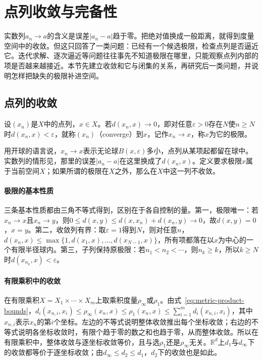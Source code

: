 \section{点列收敛与完备性}
\label{sec:metric-convergence-completeness}

实数列$a_n\to a$的含义是误差$|a_n-a|$趋于零。把绝对值换成一般距离，就得到度量空间中的收敛。但这只回答了一类问题：已经有一个候选极限，检查点列是否逼近它。迭代求解、逐次逼近等问题往往事先不知道极限在哪里，只能观察点列内部的项是否越来越接近。本节先建立收敛和它与闭集的关系，再研究后一类问题，并说明怎样把缺失的极限补进空间。

\subsection{点列的收敛}
\label{sec:metric-convergence}

\begin{definition}[点列的收敛]
\label{def:metric-convergence}
设$(x_n)$是$X$中的点列，$x\in X$。若$d(x_n,x)\to0$，即对任意$\varepsilon>0$存在$N$使$n\geq N$时$d(x_n,x)<\varepsilon$，就称$(x_n)$（converge）到$x$，记作$x_n\to x$，称$x$为它的极限。
\end{definition}

用开球的语言说，$x_n\to x$表示无论球$B(x,\varepsilon)$多小，点列从某项起都留在球中。实数列的情形见，那里的误差$|a_n-a|$在这里换成了$d(x_n,x)$。定义要求极限$x$属于当前空间$X$；如果所谓的极限在$X$之外，那么在$X$中这一列不收敛。

\paragraph{极限的基本性质}
三条基本性质都由三角不等式得到，区别在于各自控制的量。第一，极限唯一：若$x_n\to x$且$x_n\to y$，则$0\leq d(x,y)\leq d(x,x_n)+d(x_n,y)\to0$，故$d(x,y)=0$，$x=y$。第二，收敛列有界：取$\varepsilon=1$得到$N$，则对任意$n$，$d(x_n,x)\leq\max\{1,d(x_1,x),\dots,d(x_{N-1},x)\}$，所有项都落在以$x$为中心的一个有限半径球内。第三，子列保持原极限：若$n_1<n_2<\cdots$，则$n_k\geq k$，所以$k\geq N$时$d(x_{n_k},x)<\varepsilon$。

\paragraph{有限乘积中的收敛}
在有限乘积$X=X_1\times\cdots\times X_m$上取乘积度量$\rho_\infty$或$\rho_1$。由式~\eqref{eq:metric-product-bounds}，$d_i(x_{n,i},x_i)\leq\rho_\infty(x_n,x)\leq\rho_1(x_n,x)\leq\sum_{i=1}^md_i(x_{n,i},x_i)$，其中$x_{n,i}$表示$x_n$的第$i$个坐标。左边的不等式说明整体收敛推出每个坐标收敛；右边的不等式说明各坐标收敛时，有限个趋于零的数之和也趋于零，从而整体收敛。所以在有限乘积中，整体收敛与逐坐标收敛等价，且与选$\rho_1$还是$\rho_\infty$无关。$\mathbb R^d$上$d_1$与$d_\infty$下的收敛都等价于逐坐标收敛；由$d_\infty\leq d_2\leq d_1$，$d_2$下的收敛也是如此。

